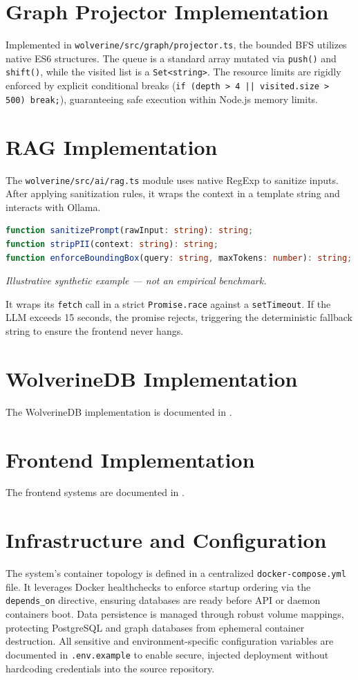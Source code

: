 \section{Graph Projector Implementation}
\label{sec:impl-projector}
Implemented in \texttt{wolverine/src/graph/projector.ts}, the bounded BFS utilizes native ES6 structures. The queue is a standard array mutated via \texttt{push()} and \texttt{shift()}, while the visited list is a \texttt{Set<string>}. The resource limits are rigidly enforced by explicit conditional breaks (\texttt{if (depth > 4 || visited.size > 500) break;}), guaranteeing safe execution within Node.js memory limits.

\section{RAG Implementation}
\label{sec:impl-rag}
The \texttt{wolverine/src/ai/rag.ts} module uses native RegExp to sanitize inputs. After applying sanitization rules, it wraps the context in a template string and interacts with Ollama.
\begin{lstlisting}[language=TypeScript, caption={RAG Sanitization Pipeline Signatures}, label={lst:rag-sanitization}]
function sanitizePrompt(rawInput: string): string;
function stripPII(context: string): string;
function enforceBoundingBox(query: string, maxTokens: number): string;
\end{lstlisting}
\textit{Illustrative synthetic example — not an empirical benchmark.}

It wraps its \texttt{fetch} call in a strict \texttt{Promise.race} against a \texttt{setTimeout}. If the LLM exceeds 15 seconds, the promise rejects, triggering the deterministic fallback string to ensure the frontend never hangs.

\section{WolverineDB Implementation}
\label{sec:impl-wolverinedb}
The WolverineDB implementation is documented in .

\section{Frontend Implementation}
\label{sec:impl-frontend}
The frontend systems are documented in .

\section{Infrastructure and Configuration}
\label{sec:impl-infra}
The system's container topology is defined in a centralized \texttt{docker-compose.yml} file. It leverages Docker healthchecks to enforce startup ordering via the \texttt{depends\_on} directive, ensuring databases are ready before API or daemon containers boot. Data persistence is managed through robust volume mappings, protecting PostgreSQL and graph databases from ephemeral container destruction. All sensitive and environment-specific configuration variables are documented in \texttt{.env.example} to enable secure, injected deployment without hardcoding credentials into the source repository.

